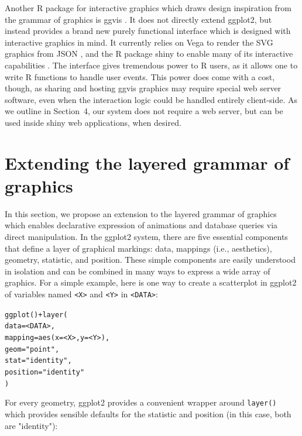 \documentclass[journal]{vgtc}\usepackage[]{graphicx}\usepackage[]{color}
\makeatletter
\newcommand{\hlstr}[1]{\textcolor[rgb]{0.502,0,0}{#1}}%
\newcommand{\hlkwd}[1]{\textcolor[rgb]{0,0,0}{#1}}%
\newenvironment{kframe}{%
 \def\at@end@of@kframe{}%
 \ifinner\ifhmode%
  \def\at@end@of@kframe{\end{minipage}}%
  \begin{minipage}{\columnwidth}%
 \fi\fi%
 \def\FrameCommand##1{\hskip\@totalleftmargin \hskip-\fboxsep
 \colorbox{shadecolor}{##1}\hskip-\fboxsep
     \hskip-\linewidth \hskip-\@totalleftmargin \hskip\columnwidth}%
 \MakeFramed {\advance\hsize-\width
   \@totalleftmargin\z@ \linewidth\hsize
   \@setminipage}}%
 {\par\unskip\endMakeFramed%
 \at@end@of@kframe}
\newenvironment{knitrout}{}{} %
\makeatother
\begin{document}
Another R package for interactive graphics which draws design inspiration from the grammar of graphics is ggvis \citep{ggvis}. It does not directly extend ggplot2, but instead provides a brand new purely functional interface which is designed with interactive graphics in mind. It currently relies on Vega to render the SVG graphics from JSON \citep{vega}, and the R package shiny to enable many of its interactive capabilities \citep{shiny}. The interface gives tremendous power to R users, as it allows one to write R functions to handle user events. This power does come with a cost, though, as sharing and hosting ggvis graphics may require special web server software, even when the interaction logic could be handled entirely client-side. As we outline in Section~4, our system does not require a web server, but can be used inside shiny web applications, when desired.

\section{Extending the layered grammar of graphics}

In this section, we propose an extension to the layered grammar of graphics \citep{ggplot2-paper} which enables declarative expression of animations and database queries via direct manipulation. In the ggplot2 system, there are five essential components that define a layer of graphical markings: data, mappings (i.e., aesthetics), geometry, statistic, and position. These simple components are easily understood in isolation and can be combined in many ways to express a wide array of graphics. For a simple example, here is one way to create a scatterplot in ggplot2 of variables named \texttt{<X>} and \texttt{<Y>} in \texttt{<DATA>}:

\begin{knitrout}
\color{fgcolor}\begin{kframe}
\begin{alltt}
\hlkwd{ggplot}() + \hlkwd{layer}(
  data = <DATA>, 
  mapping = \hlkwd{aes}(x = <X>, y = <Y>), 
  geom = \hlstr{"point"}, 
  stat = \hlstr{"identity"},
  position = \hlstr{"identity"}
)
\end{alltt}
\end{kframe}
\end{knitrout}

For every geometry, ggplot2 provides a convenient wrapper around \texttt{layer()} which provides sensible defaults for the statistic and position (in this case, both are "identity"):
\end{document}
